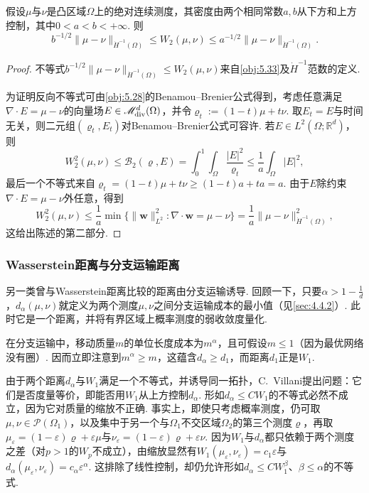 \begin{theorem}\label{obj:5.34}
假设$\mu$与$\nu$是凸区域$\Omega$上的绝对连续测度，其密度由两个相同常数$a,b$从下方和上方控制，其中$0<a<b<+\infty$. 则
\[
b^{-1/2}\|\mu-\nu\|_{\dot H^{-1}(\Omega)}
\le W_2(\mu,\nu)\le a^{-1/2}\|\mu-\nu\|_{\dot H^{-1}(\Omega)}.
\]
\end{theorem}
\begin{proof}
不等式$b^{-1/2}\|\mu-\nu\|_{\dot H^{-1}(\Omega)}\le W_2(\mu,\nu)$来自\autoref{obj:5.33}及$\dot H^{-1}$范数的定义.

\label{idx:root5-p211-bb}为证明反向不等式可由\autoref{obj:5.28}的Benamou--Brenier公式得到，考虑任意满足$\nabla\cdot E=\mu-\nu$的向量场$E\in\mathscr M^d_{\rm div}(\Omega)$，并令$\varrho_t:=(1-t)\mu+t\nu$. 取$E_t=E$与时间无关，则二元组$(\varrho_t,E_t)$对Benamou--Brenier公式可容许. 若$E\in L^2(\Omega;\mathbb R^d)$，则
\[
W_2^2(\mu,\nu)\le\mathscr B_2(\varrho,E)
=\int_0^1\int_\Omega\frac{|E|^2}{\varrho_t}
\le\frac1a\int_\Omega|E|^2,
\]
最后一个不等式来自$\varrho_t=(1-t)\mu+t\nu\ge(1-t)a+ta=a$.
由于$E$除约束$\nabla\cdot E=\mu-\nu$外任意，得到
\[
W_2^2(\mu,\nu)\le\frac1a\min\{\|\mathbf w\|_{L^2}^2:\nabla\cdot\mathbf w=\mu-\nu\}
=\frac1a\|\mu-\nu\|_{\dot H^{-1}(\Omega)}^2,
\]
这给出陈述的第二部分.
\end{proof}

\subsubsection{Wasserstein距离与分支运输距离}\label{sec:5.5.3}

另一类曾与Wasserstein距离比较的距离由分支运输诱导. 回顾一下，只要$\alpha>1-\frac1d$，$d_\alpha(\mu,\nu)$就定义为两个测度$\mu,\nu$之间分支运输成本的最小值（见\autoref{sec:4.4.2}）. 此时它是一个距离，并将有界区域上概率测度的弱收敛度量化.

在分支运输中，移动质量$m$的单位长度成本为$m^\alpha$，且可假设$m\le1$（因为最优网络没有圈）. 因而立即注意到$m^\alpha\ge m$，这蕴含$d_\alpha\ge d_1$，而距离$d_1$正是$W_1$.

由于两个距离$d_\alpha$与$W_1$满足一个不等式，并诱导同一拓扑，C.~Villani提出问题：它们是否度量等价，即能否用$W_1$从上方控制$d_\alpha$. 形如$d_\alpha\le CW_1$的不等式必然不成立，因为它对质量的缩放不正确. 事实上，即使只考虑概率测度，仍可取$\mu,\nu\in\mathscr P(\Omega_1)$，以及集中于另一个与$\Omega_1$不交区域$\Omega_2$的第三个测度$\varrho$，再取$\mu_\varepsilon=(1-\varepsilon)\varrho+\varepsilon\mu$与$\nu_\varepsilon=(1-\varepsilon)\varrho+\varepsilon\nu$. 因为$W_1$与$d_\alpha$都只依赖于两个测度之差（对$p>1$的$W_p$不成立），由缩放显然有$W_1(\mu_\varepsilon,\nu_\varepsilon)=c_1\varepsilon$与$d_\alpha(\mu_\varepsilon,\nu_\varepsilon)=c_\alpha\varepsilon^\alpha$. 这排除了线性控制，却仍允许形如$d_\alpha\le CW_1^\beta$、$\beta\le\alpha$的不等式.

